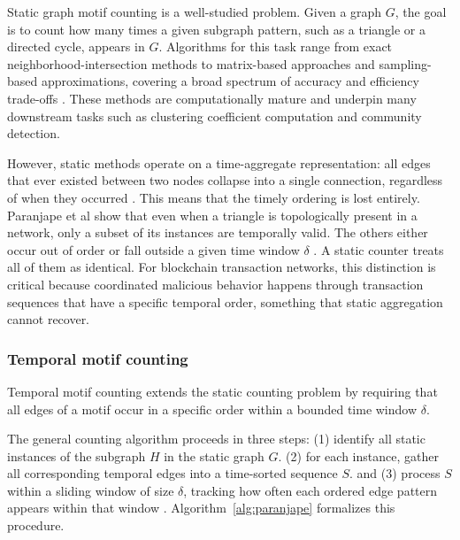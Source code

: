 \documentclass{thesisclass}
\begin{document}
Static graph motif counting is a well-studied problem. Given a graph $G$, the goal is to count how many times a given subgraph pattern, such as a triangle or a directed cycle, appears in $G$. Algorithms for this task range from exact neighborhood-intersection methods to matrix-based approaches and sampling-based approximations, covering a broad spectrum of accuracy and efficiency trade-offs \cite{Yin2025}. These methods are computationally mature and underpin many downstream tasks such as clustering coefficient computation and community detection.

However, static methods operate on a time-aggregate representation: all edges that ever existed between two nodes collapse into a single connection, regardless of when they occurred \cite{kovanen2011temporal}. This means that the timely ordering is lost entirely. Paranjape et al \citet{paranjape2017motifs} show that even when a triangle is topologically present in a network, only a subset of its instances are temporally valid. The others either occur out of order or fall outside a given time window $\delta$ \cite{paranjape2017motifs}. A static counter treats all of them as identical. For blockchain transaction networks, this distinction is critical because coordinated malicious behavior happens through transaction sequences that have a specific temporal order, something that static aggregation cannot recover.

\subsubsection{Temporal motif counting}
Temporal motif counting extends the static counting problem by requiring that all edges of a motif occur in a specific order within a bounded time window $\delta$. 

The general counting algorithm proceeds in three steps: (1) identify all
static instances of the subgraph $H$ in the static graph $G$.
(2) for each instance, gather all corresponding temporal edges into a
time-sorted sequence $S$. and (3) process $S$ within a sliding window of
size $\delta$, tracking how often each ordered edge pattern appears
within that window \citep{paranjape2017motifs}. Algorithm~\ref{alg:paranjape}
formalizes this procedure.
\end{document}
